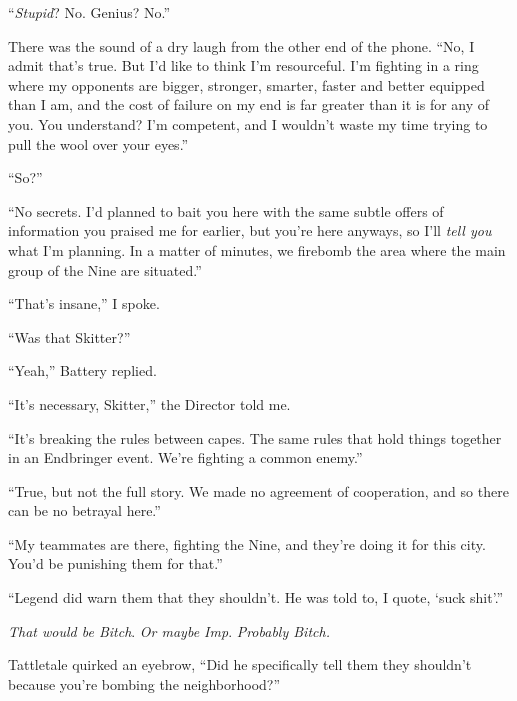 ``\emph{Stupid}?  No.  Genius?  No.''



There was the sound of a dry laugh from the other end of the phone.  ``No, I admit that's true.  But I'd like to think I'm resourceful.  I'm fighting in a ring where my opponents are bigger, stronger, smarter, faster and better equipped than I am, and the cost of failure on my end is far greater than it is for any of you.  You understand?  I'm competent, and I wouldn't waste my time trying to pull the wool over your eyes.''



``So?''



``No secrets.  I'd planned to bait you here with the same subtle offers of information you praised me for earlier, but you're here anyways, so I'll \emph{tell you} what I'm planning.  In a matter of minutes, we firebomb the area where the main group of the Nine are situated.''



``That's insane,'' I spoke.



``Was that Skitter?''



``Yeah,'' Battery replied.



``It's necessary, Skitter,'' the Director told me.



``It's breaking the rules between capes.  The same rules that hold things together in an Endbringer event.  We're fighting a common enemy.''



``True, but not the full story.  We made no agreement of cooperation, and so there can be no betrayal here.''



``My teammates are there, fighting the Nine, and they're doing it for this city.  You'd be punishing them for that.''



``Legend did warn them that they shouldn't.  He was told to, I quote, `suck shit'.''



\emph{That would be Bitch}.  \emph{Or maybe Imp}.  \emph{Probably Bitch.}



Tattletale quirked an eyebrow, ``Did he specifically tell them they shouldn't because you're bombing the neighborhood?''




